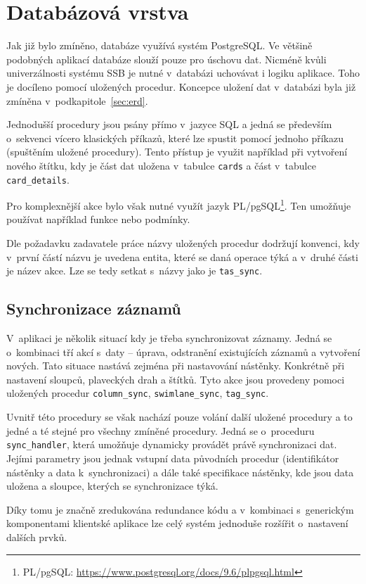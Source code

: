 \section{Databázová vrstva}
Jak již bylo zmíněno, databáze využívá systém PostgreSQL. Ve většině podobných aplikací databáze slouží pouze pro úschovu dat. Nicméně kvůli univerzálnosti systému SSB je nutné v~databázi uchovávat i logiku aplikace. Toho je docíleno pomocí uložených procedur. Koncepce uložení dat v~databázi byla již zmíněna v~podkapitole~\ref{sec:erd}.

Jednodušší procedury jsou psány přímo v~jazyce SQL a jedná se především o~sekvenci vícero klasických příkazů, které lze spustit pomocí jednoho příkazu (spuštěním uložené procedury). Tento přístup je využit například při vytvoření nového štítku, kdy je část dat uložena v~tabulce \texttt{cards} a část v~tabulce \texttt{card\_details}.

Pro komplexnější akce bylo však nutné využít jazyk PL/pgSQL\footnote{PL/pgSQL: \url{https://www.postgresql.org/docs/9.6/plpgsql.html}}. Ten umožňuje používat například funkce nebo podmínky.

Dle požadavku zadavatele práce názvy uložených procedur dodržují konvenci, kdy v~první částí názvu je uvedena entita, které se daná operace týká a v~druhé části je název akce. Lze se tedy setkat s~názvy jako je \texttt{tas\_sync}. 


\subsection{Synchronizace záznamů}
V~aplikaci je několik situací kdy je třeba synchronizovat záznamy. Jedná se o~kombinaci tří akcí s~daty -- úprava, odstranění existujících záznamů a vytvoření nových. Tato situace nastává zejména při nastavování nástěnky. Konkrétně při nastavení sloupců, plaveckých drah a štítků. Tyto akce jsou provedeny pomoci uložených procedur \texttt{column\_sync}, \texttt{swimlane\_sync}, \texttt{tag\_sync}.

Uvnitř této procedury se však nachází pouze volání další uložené procedury a to jedné a té stejné pro všechny zmíněné procedury. Jedná se o~proceduru \texttt{sync\_handler}, která umožňuje dynamicky provádět právě synchronizaci dat. Jejími parametry jsou jednak vstupní data původních procedur (identifikátor nástěnky a data k~synchronizaci) a dále také specifikace nástěnky, kde jsou data uložena a sloupce, kterých se synchronizace týká.

Díky tomu je značně zredukována redundance kódu a v~kombinaci s~generickým komponentami klientské aplikace lze celý systém jednoduše rozšířit o~nastavení dalších prvků.



